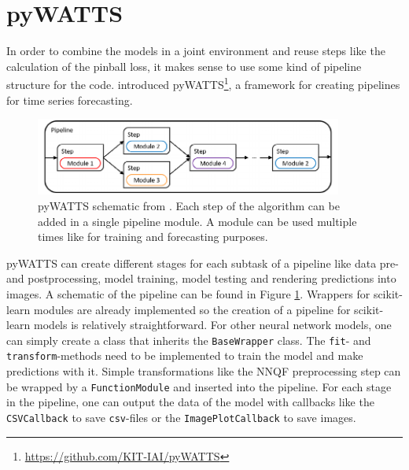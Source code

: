 \section{pyWATTS}
\label{sec:pywatts}

In order to combine the models in a joint environment 
and reuse steps like the calculation of the pinball loss, 
it makes sense to use some kind of pipeline structure for the code. 
\Textcite{Heidrich2021} introduced 
pyWATTS\footnote{\url{https://github.com/KIT-IAI/pyWATTS}}, a framework 
for creating pipelines for time series forecasting. 

\begin{figure}[h]%
    \centering
    \includegraphics[width=0.9\textwidth]{plots/pywatts-schematic.pdf}
    \caption[pywATTS schematic]{pyWATTS schematic from \Textcite{Heidrich2021}. 
    Each step of the algorithm can be added in a single pipeline module. 
    A module can be used multiple times like for training and forecasting purposes.}
    \label{fig:pywatts-schematic}%
\end{figure}

pyWATTS can create different stages for each subtask of a pipeline like 
data pre- and postprocessing, model training, model testing and 
rendering predictions into images. A schematic of the pipeline 
can be found in Figure \ref{fig:pywatts-schematic}. Wrappers for scikit-learn 
modules are already implemented so the creation of a pipeline 
for scikit-learn models is relatively straightforward. 
For other neural network models, one can simply create a class that inherits the 
\texttt{BaseWrapper} class. The \texttt{fit}- and \texttt{transform}-methods 
need to be implemented to train the model and make predictions with it. 
Simple transformations like the NNQF preprocessing step can be 
wrapped by a \texttt{FunctionModule} and inserted into the pipeline.
For each stage in the pipeline, one can output the data of the model 
with callbacks like the \texttt{CSVCallback} to save \texttt{csv}-files or 
the \texttt{ImagePlotCallback} to save images.